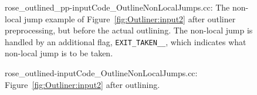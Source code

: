 \begin{figure}[!h]
{\indent
{\mySmallFontSize
\begin{latexonly}
   
\end{latexonly}
\begin{htmlonly}
   
\end{htmlonly}

}
}
\caption{rose\_outlined\_pp-inputCode\_OutlineNonLocalJumps.cc: The
non-local jump example of Figure~\ref{fig:Outliner:input2} after
outliner preprocessing, but before the actual outlining.  The
non-local jump is handled by an additional flag,
\texttt{EXIT\_TAKEN\_\_}, which indicates what non-local jump is to be
taken.}
\label{fig:Outliner:preproc2}
\end{figure}

\begin{figure}[!h]
{\indent
{\mySmallFontSize
\begin{latexonly}
   
\end{latexonly}
\begin{htmlonly}
   
\end{htmlonly}

}
}
\caption{rose\_outlined-inputCode\_OutlineNonLocalJumps.cc:
Figure~\ref{fig:Outliner:input2} after outlining.}
\label{fig:Outliner:output2}
\end{figure}

